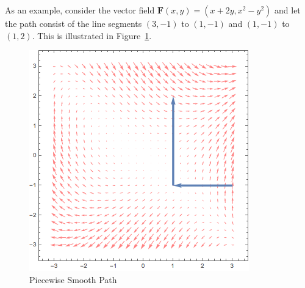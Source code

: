 \documentclass[12pt]{article}
\begin{document}
 As an example, consider the vector field $\mathbf{F}(x,y) = (x+2y, x^2-y^2)$ and let the path consist of the line segments $(3,-1)$ to $(1,-1)$ and $(1,-1)$ to $(1,2)$. This is illustrated in Figure~\ref{fig:lineintegralexample}.

\begin{figure}[h!]
\centering
\caption{Piecewise Smooth Path}
\label{fig:lineintegralexample}
\indent\includegraphics[scale=0.6]{line_integral_example.png}
\end{figure}
\end{document}
